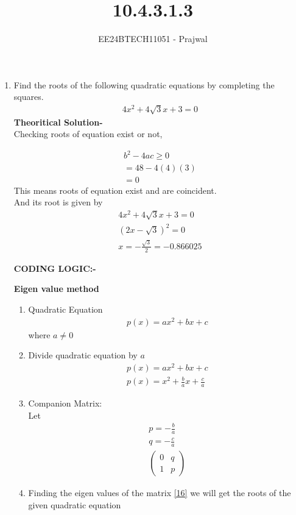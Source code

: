 \documentclass[journal]{IEEEtran}
\numberwithin{equation}{enumi}
\numberwithin{figure}{enumi}
\begin{document}

\title{10.4.3.1.3}
\author{EE24BTECH11051 - Prajwal}
{\let\newpage\relax\maketitle}
\begin{enumerate}
\item Find the roots of the following quadratic equations by completing the squares.
\begin{align}
4x^2 + 4\sqrt{3}x + 3 = 0
\end{align}
\textbf{Theoritical Solution-}\\
Checking roots of equation exist or not,

\begin{align}
b^2 - 4ac \geq 0 \\
= 48 - 4(4)(3)\\
= 0 
\end{align}
This means roots of equation exist and are coincident.\\
And its root is given by 
\begin{align}
4x^2 + 4\sqrt{3}x + 3 = 0 \\
(2x-\sqrt{3})^2 = 0 \\
x = -\frac{\sqrt{3}}{2}=-0.866025
\end{align} 

\textbf{CODING LOGIC:-}


\textbf{Eigen value method}
\begin{enumerate}
\item Quadratic Equation
\begin{align}
 p(x)=ax^2+bx+c   
\end{align}
where $a \neq 0$
\item Divide quadratic equation by $a$
\begin{align}
    p(x)=ax^2+bx+c   \\
    p(x)=x^2+\frac{b}{a}x+\frac{c}{a}
\end{align}
\item Companion Matrix:\\
Let
\begin{align}
    p=-\frac{b}{a} \\
    q=-\frac{c}{a} \\
    \begin{pmatrix}
        0 & q \\
        1 & p  \label{16}
    \end{pmatrix}
\end{align}
\item Finding the eigen values of the matrix \eqref{16} we will get the roots of the given quadratic equation
\end{enumerate}



\end{enumerate}
\end{document}
